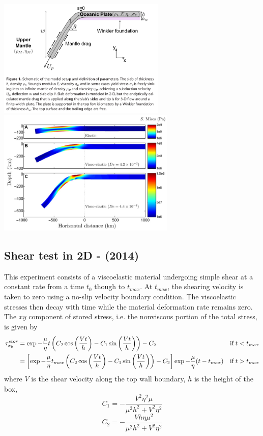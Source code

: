 \begin{center}
\includegraphics[width=8cm]{images/viscoelasticity/fogm14b}
\includegraphics[width=8.5cm]{images/viscoelasticity/fogm14c}\\
\end{center}












\subsection{Shear test in 2D - \textcite{famc14} (2014)}

This experiment consists of a viscoelastic material undergoing simple shear at a constant 
rate from a time $t_0$ though to $t_{max}$. At $t_{max}$, the shearing velocity is taken 
to zero using a no-slip velocity boundary condition. The viscoelastic stresses then decay
with time while the material deformation rate remains zero. The $xy$ component of stored 
stress, i.e. the nonviscous portion of the total stress, is given by
\begin{align}
\tau_{xy}^{stor} 
&= 
\exp -\frac{\mu}{\eta}t 
\left(
C_2 \cos\left( \frac{Vt}{h}\right)
-C_1 \sin\left( \frac{Vt}{h}\right)
\right)
-C_2 & \textrm{if} \; t<t_{max} \nonumber\\
&= \left[\exp -\frac{\mu}{\eta}t_{max} 
\left(
C_2 \cos\left( \frac{Vt}{h}\right)
-C_1 \sin\left( \frac{Vt}{h}\right)
\right)
-C_2 \right] \exp -\frac{\mu}{\eta}(t-t_{max})
& \textrm{if} \; t>t_{max} 
\end{align}
where $V$ is the shear velocity along the top wall boundary, 
$h$ is the height of the box,
\[
C_1=-\frac{V^2 \eta^2 \mu}{\mu^2 h^2 + V^2 \eta^2}
\]
\[
C_2=-\frac{Vh\eta \mu^2}{\mu^2 h^2 + V^2 \eta^2}
\]



